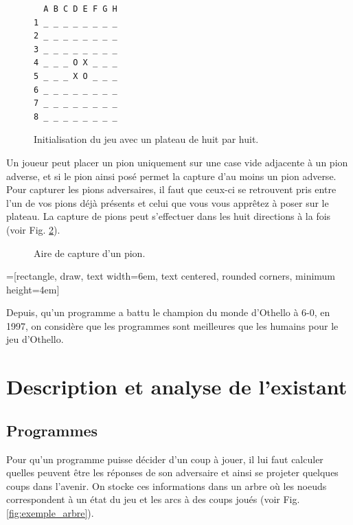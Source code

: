 \documentclass[10pt,a4paper]{article}
\begin{document}
\begin{figure}[H]    
\centering
\begin{BVerbatim}
  A B C D E F G H
1 _ _ _ _ _ _ _ _
2 _ _ _ _ _ _ _ _
3 _ _ _ _ _ _ _ _
4 _ _ _ O X _ _ _
5 _ _ _ X O _ _ _
6 _ _ _ _ _ _ _ _
7 _ _ _ _ _ _ _ _
8 _ _ _ _ _ _ _ _
\end{BVerbatim}
\caption {Initialisation du jeu avec un plateau de huit par huit. \label{fig:début_du_jeu}}
\end{figure}
\newpage
Un joueur peut placer un pion uniquement sur une case vide adjacente à un pion adverse, et si le pion ainsi posé permet la capture d'au moins un pion adverse. Pour capturer les pions adversaires, il faut que ceux-ci se retrouvent pris entre l'un de vos pions déjà présents et celui que vous vous apprêtez à poser sur le plateau. La capture de pions peut s'effectuer dans les huit directions à la fois (voir Fig. \ref{fig:aire_de_capture}).

\begin{figure}[H]    
\centering
{}
\caption {Aire de capture d'un pion.\label{fig:aire_de_capture}}
\end{figure}
=[rectangle, draw, text width=6em, text centered, rounded corners, minimum height=4em]

Depuis, qu'un programme a battu le champion du monde d'Othello à 6-0, en 1997\cite{CK06}, on considère que les programmes sont meilleures que les humains pour le jeu d'Othello.

\section{Description et analyse de l'existant}

\subsection{Programmes}

Pour qu'un programme puisse décider d'un coup à jouer, il lui faut calculer quelles peuvent être les réponses de son adversaire et ainsi se projeter quelques coups dans l'avenir. On stocke ces informations dans un arbre où les noeuds correspondent à un état du jeu et les arcs à des coups joués (voir Fig. \ref{fig:exemple_arbre}).\\
\end{document}

